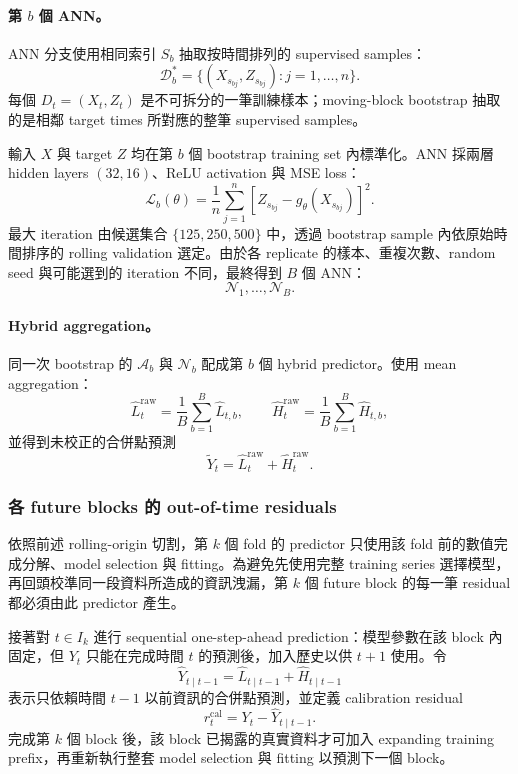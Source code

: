 \paragraph{第 $b$ 個 ANN。}

ANN 分支使用相同索引 $S_b$ 抽取按時間排列的 supervised samples：
\[
    \mathcal D_b^\ast=\{(X_{s_{bj}},Z_{s_{bj}}):j=1,\ldots,n\}.
\]
每個 $D_t=(X_t,Z_t)$ 是不可拆分的一筆訓練樣本；moving-block bootstrap 抽取的是相鄰 target times 所對應的整筆 supervised samples。

輸入 $X$ 與 target $Z$ 均在第 $b$ 個 bootstrap training set 內標準化。ANN 採兩層 hidden layers $(32,16)$、ReLU activation 與 MSE loss：
\[
    \mathcal L_b(\theta)
    =\frac{1}{n}\sum_{j=1}^{n}
    \left[Z_{s_{bj}}-g_{\theta}(X_{s_{bj}})\right]^2.
\]
最大 iteration 由候選集合 $\{125,250,500\}$ 中，透過 bootstrap sample 內依原始時間排序的 rolling validation 選定。由於各 replicate 的樣本、重複次數、random seed 與可能選到的 iteration 不同，最終得到 $B$ 個 ANN：
\[
    \mathcal N_1,\ldots,\mathcal N_B.
\]

\paragraph{Hybrid aggregation。}

同一次 bootstrap 的 $\mathcal A_b$ 與 $\mathcal N_b$ 配成第 $b$ 個 hybrid predictor。使用 mean aggregation：
\[
    \widehat L_t^{\mathrm{raw}}
    =\frac{1}{B}\sum_{b=1}^{B}\widehat L_{t,b},
    \qquad
    \widehat H_t^{\mathrm{raw}}
    =\frac{1}{B}\sum_{b=1}^{B}\widehat H_{t,b},
\]
並得到未校正的合併點預測
\[
    \widetilde Y_t
    =\widehat L_t^{\mathrm{raw}}+\widehat H_t^{\mathrm{raw}}.
\]

\subsubsection{各 future blocks 的 out-of-time residuals}

依照前述 rolling-origin 切割，第 $k$ 個 fold 的 predictor 只使用該 fold 前的數值完成分解、model selection 與 fitting。為避免先使用完整 training series 選擇模型，再回頭校準同一段資料所造成的資訊洩漏，第 $k$ 個 future block 的每一筆 residual 都必須由此 predictor 產生。

接著對 $t\in I_k$ 進行 sequential one-step-ahead prediction：模型參數在該 block 內固定，但 $Y_t$ 只能在完成時間 $t$ 的預測後，加入歷史以供 $t+1$ 使用。令
\[
    \widehat Y_{t\mid t-1}
    =\widehat L_{t\mid t-1}+\widehat H_{t\mid t-1}
\]
表示只依賴時間 $t-1$ 以前資訊的合併點預測，並定義 calibration residual
\[
    r_t^{\mathrm{cal}}
    =Y_t-\widehat Y_{t\mid t-1}.
\]
完成第 $k$ 個 block 後，該 block 已揭露的真實資料才可加入 expanding training prefix，再重新執行整套 model selection 與 fitting 以預測下一個 block。

